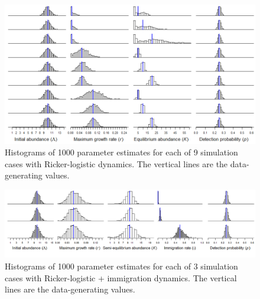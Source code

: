 \documentclass[12pt]{article}
\begin{document}
\begin{figure}
  \centering
  \includegraphics{figs/rick_hists}
\caption{Histograms of 1000 parameter estimates for each of 9
simulation cases with Ricker-logistic dynamics. The vertical lines are the 
data-generating values.}
\label{fig:rick_hists}
\end{figure}

\begin{figure}
  \centering
  \includegraphics[width=8.5in]{figs/ricki_hists}
\caption{Histograms of 1000 parameter estimates for each of 3
simulation cases with Ricker-logistic + immigration dynamics. The vertical lines are the 
data-generating values.}
\label{fig:ricki_hists}
\end{figure}
\end{document}
